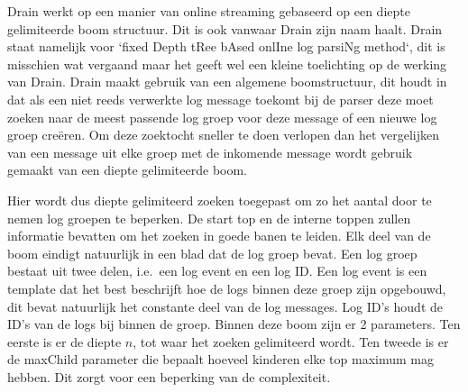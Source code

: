 Drain werkt op een manier van online streaming gebaseerd op een diepte gelimiteerde boom structuur. Dit is ook vanwaar Drain zijn naam haalt. Drain staat namelijk voor `fixed Depth tRee bAsed onlIne log parsiNg method`, dit is misschien wat vergaand maar het geeft wel een kleine toelichting op de werking van Drain. Drain maakt gebruik van een algemene boomstructuur, dit houdt in dat als een niet reeds verwerkte log message toekomt bij de parser deze moet zoeken naar de meest passende log groep voor deze message of een nieuwe log groep creëren. Om deze zoektocht sneller te doen verlopen dan het vergelijken van een message uit elke groep met de inkomende message wordt gebruik gemaakt van een diepte gelimiteerde boom. 

Hier wordt dus diepte gelimiteerd zoeken toegepast om zo het aantal door te nemen log groepen te beperken. De start top en de interne toppen zullen informatie bevatten om het zoeken in goede banen te leiden. Elk deel van de boom eindigt natuurlijk in een blad dat de log groep bevat. Een log groep bestaat uit twee delen, i.e.\ een log event en een log ID. Een log event is een template dat het best beschrijft hoe de logs binnen deze groep zijn opgebouwd, dit bevat natuurlijk het constante deel van de log messages. Log ID's houdt de ID's van de logs bij binnen de groep. Binnen deze boom zijn er 2 parameters. Ten eerste is er de diepte $n$, tot waar het zoeken gelimiteerd wordt. Ten tweede is er de maxChild parameter die bepaalt hoeveel kinderen elke top maximum mag hebben. Dit zorgt voor een beperking van de complexiteit. 

